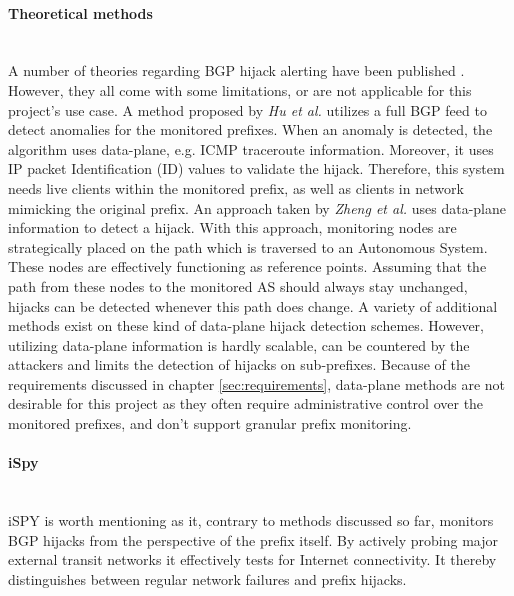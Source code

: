 \paragraph{Theoretical methods}\label{par:theoretical}\mbox{ }\\
A number of theories regarding BGP hijack alerting have been published \cite{hu2007accurate,zheng2007light,lad2006phas,bgpduplicate,avramopoulos2006stealth,biersack2012visual,yan2009bgpmon,zhang2008ispy,shi2012detecting}. However, they all come with some limitations, or are not applicable for this project's use case. A method proposed by \emph{Hu et al.} \cite{hu2007accurate} utilizes a full BGP feed to detect anomalies for the monitored prefixes. When an anomaly is detected, the algorithm uses data-plane, e.g. ICMP traceroute information. Moreover, it uses IP packet Identification (ID) values to validate the hijack. Therefore, this system needs live clients within the monitored prefix, as well as clients in network mimicking the original prefix. An approach taken by \emph{Zheng et al.} \cite{zheng2007light} uses data-plane information to detect a hijack. With this approach, monitoring nodes are strategically placed on the path which is traversed to an Autonomous System. These nodes are effectively functioning as reference points. Assuming that the path from these nodes to the monitored AS should always stay unchanged, hijacks can be detected whenever this path does change. A variety of additional methods \cite{avramopoulos2006stealth,biersack2012visual} exist on these kind of data-plane hijack detection schemes. However, utilizing data-plane information is hardly scalable\cite{shi2012detecting}, can be countered by the attackers \cite{zheng2007light} and limits the detection of hijacks on sub-prefixes\cite{zheng2007light}. Because of the requirements discussed in chapter \ref{sec:requirements}, data-plane methods are not desirable for this project as they often require administrative control over the monitored prefixes, and don't support granular prefix monitoring\cite{shi2012detecting}.

\paragraph{iSpy}\label{par:ispy}\mbox{ }\\
iSPY\cite{zhang2008ispy} is worth mentioning as it, contrary to methods discussed so far, monitors BGP hijacks from the perspective of the prefix itself. By actively probing major external transit networks it effectively tests for Internet connectivity. It thereby distinguishes between regular network failures and prefix hijacks.

